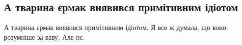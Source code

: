  
 
 
 
 
\subsection{А тварина єрмак виявився примітивним ідіотом}
\label{sec:17_04_2021.fb.makarenko_oksana.1.jermak}

А тварина єрмак виявився примітивним ідіотом. Я все ж думала, що воно розумніше
за ваву. Але нє.
